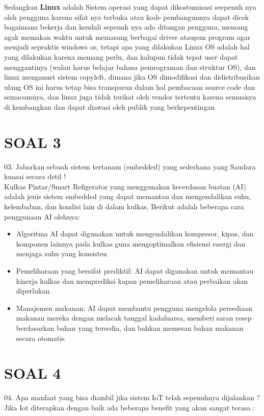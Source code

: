 \documentclass{article}
\begin{document}
Sedangkan \textbf{Linux} adalah Sistem operasi yang dapat dikostumisasi seepenuh nya oleh pengguna karena sifat nya terbuka atau kode pembangunnya dapat dicek bagaimana bekerja dan kendali sepenuh nya ada ditangan pengguna, memang agak memakan waktu untuk memasang berbagai driver ataupun program agar menjadi sepraktis windows os, tetapi apa yang dilakukan Linux OS adalah hal yang dilakukan karena memang perlu, dan kalupun tidak tepat user dapat menggantinya (walau harus belajar bahasa pemrograman dan struktur OS), dan linux menganust sistem copyleft, dimana jika OS dimodifikasi dan didistribusikan ulang OS ini harus tetap bisa transparan dalam hal pembacaan source code dan semacamnya, dan linux juga tidak terikat oleh vendor tertentu karena semuanya di kembangkan dan dapat diawasi oleh publik yang berkepentingan


\section*{SOAL 3}
03.	Jabarkan sebuah sistem tertanam (embedded) yang sederhana yang Saudara kuasai secara detil !\\
\smallbreak
Kulkas Pintar/Smart Refigerator yang menggunakan kecerdasan buatan (AI) adalah jenis sistem embedded yang dapat memantau dan mengendalikan suhu, kelembaban, dan kondisi lain di dalam kulkas. Berikut adalah beberapa cara penggunaan AI olehnya:
\begin{itemize}
    \item Algoritma AI dapat digunakan untuk mengendalikan kompresor, kipas, dan komponen lainnya pada kulkas guna mengoptimalkan efisiensi energi dan menjaga suhu yang konsisten
    \item Pemeliharaan yang bersifat prediktif: AI dapat digunakan untuk memantau kinerja kulkas dan memprediksi kapan pemeliharaan atau perbaikan akan diperlukan.
    \item Manajemen makanan: AI dapat membantu pengguna mengelola persediaan makanan mereka dengan melacak tanggal kadaluarsa, memberi saran resep berdasarkan bahan yang tersedia, dan bahkan memesan bahan makanan secara otomatis
\end{itemize}

\section*{SOAL 4}
04. Apa manfaat yang bisa diambil jika sistem IoT telah sepenuhnya dijalankan ?\\
\smallbreak
Jika Iot diterapkan dengan baik ada beberapa benefit yang akan sangat terasa :
\end{document}
